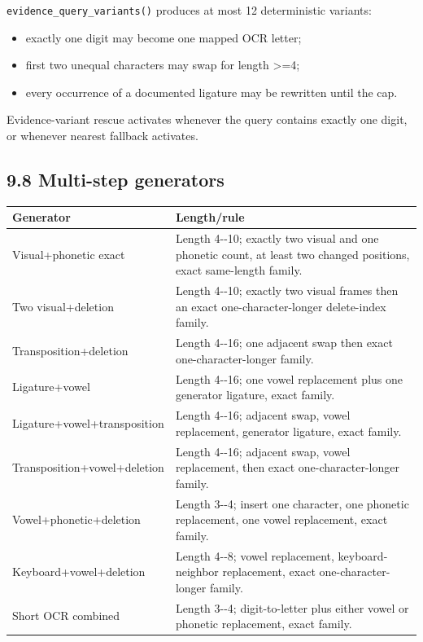 \texttt{evidence\_\allowbreak{}query\_\allowbreak{}variants()} produces at most 12 deterministic variants:

\begin{itemize}
\tightlist
\item
  exactly one digit may become one mapped OCR letter;
\item
  first two unequal characters may swap for length \textgreater=4;
\item
  every occurrence of a documented ligature may be rewritten until the cap.
\end{itemize}

Evidence-variant rescue activates whenever the query contains exactly one digit, or whenever nearest fallback activates.

\subsection{9.8 Multi-step generators}\label{98-multi-step-generators}

{\def\LTcaptype{none} %
\begin{longtable}[]{@{}>{\RaggedRight\arraybackslash}p{.27\linewidth}>{\RaggedRight\arraybackslash}p{.66\linewidth}@{}}
\toprule\noalign{}
Generator & Length/rule \\
\midrule\noalign{}
\endhead
\bottomrule\noalign{}
\endlastfoot
Visual+phonetic exact & Length 4-\/-10; exactly two visual and one phonetic count, at least two changed positions, exact same-length family. \\
Two visual+deletion & Length 4-\/-10; exactly two visual frames then an exact one-character-longer delete-index family. \\
Transposition+deletion & Length 4-\/-16; one adjacent swap then exact one-character-longer family. \\
Ligature+vowel & Length 4-\/-16; one vowel replacement plus one generator ligature, exact family. \\
Ligature+vowel+transposition & Length 4-\/-16; adjacent swap, vowel replacement, generator ligature, exact family. \\
Transposition+vowel+deletion & Length 4-\/-16; adjacent swap, vowel replacement, then exact one-character-longer family. \\
Vowel+phonetic+deletion & Length 3-\/-4; insert one character, one phonetic replacement, one vowel replacement, exact family. \\
Keyboard+vowel+deletion & Length 4-\/-8; vowel replacement, keyboard-neighbor replacement, exact one-character-longer family. \\
Short OCR combined & Length 3-\/-4; digit-to-letter plus either vowel or phonetic replacement, exact family. \\
\end{longtable}
}

